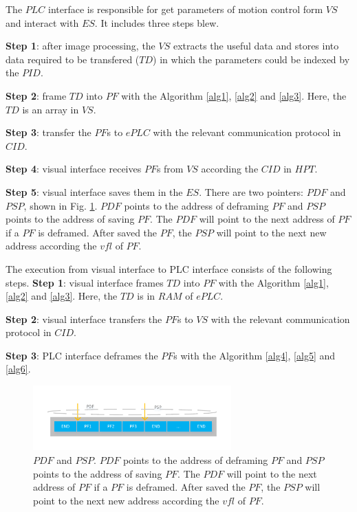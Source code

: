 \documentclass[journal,UTF8]{IEEEtran}
\begin{document}
The $PLC$ interface is responsible for get parameters of motion control form $VS$ and interact with $ES$. It includes three steps blew.

\textbf{Step 1}: after image processing, the $VS$ extracts the useful data and stores into data required to be transfered ($TD$) in which the parameters could be indexed by the $PID$.

\textbf{Step 2}: frame $TD$ into $PF$ with the Algorithm \ref{alg1}, \ref{alg2} and \ref{alg3}. Here, the $TD$ is an array in $VS$.

\textbf{Step 3}: transfer the $PF$s to $ePLC$ with the relevant communication protocol in $CID$.

\textbf{Step 4}: visual interface receives $PF$s from $VS$ according the $CID$ in $HPT$.

\textbf{Step 5}: visual interface saves them in the $ES$. There are two pointers: $PDF$ and $PSP$, shown in Fig. \ref{fig:VisualInterface}. $PDF$ points to the address of deframing $PF$ and $PSP$ points to the address of saving $PF$. The $PDF$ will point to the next address of $PF$ if a $PF$ is deframed. After saved the $PF$, the $PSP$ will point to the next new address according the $vfl$ of $PF$. 

The execution from visual interface to PLC interface consists of the following steps.
\textbf{Step 1}: visual interface frames $TD$ into $PF$ with the Algorithm \ref{alg1}, \ref{alg2} and \ref{alg3}. Here, the $TD$ is in $RAM$ of $ePLC$.

\textbf{Step 2}: visual interface transfers the $PF$s to $VS$ with the relevant communication protocol in $CID$.

\textbf{Step 3}: PLC interface deframes the $PF$s with the Algorithm \ref{alg4}, \ref{alg5} and \ref{alg6}.
\begin{figure}
	\centering
	\includegraphics[width=3in]{fig/VisualInterface.pdf}
	\caption{ $PDF$ and $PSP$. $PDF$ points to the address of deframing $PF$ and $PSP$ points to the address of saving $PF$. The $PDF$ will point to the next address of $PF$ if a $PF$ is deframed. After saved the $PF$, the $PSP$ will point to the next new address according the $vfl$ of $PF$.}
	\label{fig:VisualInterface}
\end{figure}
\end{document}

